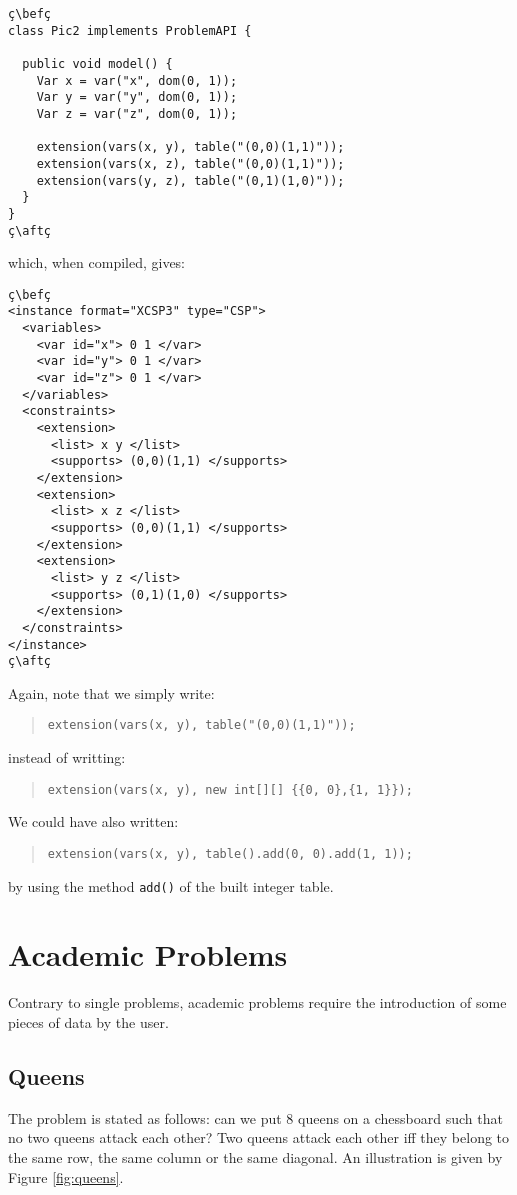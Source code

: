 \documentclass[10pt]{article}
\newcommand{\nn}[1]{{\tt #1}} %
\def\bef{\rule{10cm}{0.1mm}} %
\def\aft{\rule{10cm}{0.1mm}\medskip}
\begin{document}
\begin{lstlisting}
ç\befç
class Pic2 implements ProblemAPI {
  
  public void model() {
    Var x = var("x", dom(0, 1));
    Var y = var("y", dom(0, 1));
    Var z = var("z", dom(0, 1));
    
    extension(vars(x, y), table("(0,0)(1,1)"));
    extension(vars(x, z), table("(0,0)(1,1)"));
    extension(vars(y, z), table("(0,1)(1,0)"));
  }
}
ç\aftç
\end{lstlisting}
which, when compiled, gives:
\begin{lstlisting}
ç\befç
<instance format="XCSP3" type="CSP">
  <variables>
    <var id="x"> 0 1 </var>
    <var id="y"> 0 1 </var>
    <var id="z"> 0 1 </var>
  </variables>
  <constraints>
    <extension>
      <list> x y </list>
      <supports> (0,0)(1,1) </supports>
    </extension>
    <extension>
      <list> x z </list>
      <supports> (0,0)(1,1) </supports>
    </extension>
    <extension>
      <list> y z </list>
      <supports> (0,1)(1,0) </supports>
    </extension>
  </constraints>
</instance>
ç\aftç
\end{lstlisting}


Again, note that we simply write:
\begin{quote}
  \verb!extension(vars(x, y), table("(0,0)(1,1)"));!
\end{quote}
instead of writting:
\begin{quote}
  \verb!extension(vars(x, y), new int[][] {{0, 0},{1, 1}});!
\end{quote}

We could have also written:
\begin{quote}
  \verb!extension(vars(x, y), table().add(0, 0).add(1, 1));!
\end{quote}
by using the method \nn{add()} of the built integer table.


\section{Academic Problems}

Contrary to single problems, academic problems require the introduction of some pieces of data by the user.


\subsection{Queens}

The problem is stated as follows: can we put 8 queens on a chessboard such that no two queens attack each other?
Two queens attack each other iff they belong to the same row, the same column or the same diagonal.
An illustration is given by Figure \ref{fig:queens}.
\end{document}
